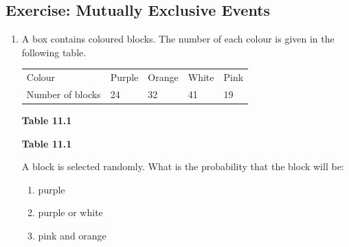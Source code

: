             \subsection{Exercise: Mutually Exclusive Events }
            \nopagebreak
            \label{m39377*id114930}\begin{enumerate}[noitemsep, label=\textbf{\arabic*}. ] 
            \label{m39377*uid79}\item A box contains coloured blocks. The number of each colour is given in
the following table.
          \begin{table}
        \begin{center}
      \label{m39377*id114946}
    \noindent
      \tablelasttail{}
      \begin{xtabular}[t]{|l|l|l|l|l|}\hline
        Colour &
        Purple &
        Orange &
        White &
        Pink%
     \tabularnewline{}
        Number of
blocks &
        24 &
        32 &
        41 &
        19%
     \tabularnewline{}
    \end{xtabular}
      \end{center}
    \begin{center}{\small\bfseries Table 11.1}\end{center}
    \begin{caption}{\small\bfseries Table 11.1}\end{caption}
\end{table}
    \par
A block is selected randomly. What is the probability that the block will be:
\label{m39377*id115050}\begin{enumerate}[noitemsep, label=\textbf{\alph*}. ] 
            \label{m39377*uid80}\item purple
\label{m39377*uid81}\item purple or white
\label{m39377*uid82}\item pink and orange

\end{enumerate}
\end{enumerate}
